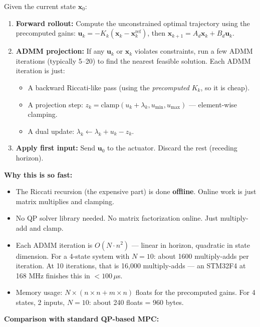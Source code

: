 Given the current state $\mathbf{x}_0$:
\begin{enumerate}
    \item \textbf{Forward rollout:} Compute the unconstrained optimal trajectory using the precomputed gains: $\mathbf{u}_k = -K_k (\mathbf{x}_k - \mathbf{x}_k^{\text{ref}})$, then $\mathbf{x}_{k+1} = A_d \mathbf{x}_k + B_d \mathbf{u}_k$.
    \item \textbf{ADMM projection:} If any $\mathbf{u}_k$ or $\mathbf{x}_k$ violates constraints, run a few ADMM iterations (typically 5--20) to find the nearest feasible solution. Each ADMM iteration is just:
    \begin{itemize}[nosep]
        \item A backward Riccati-like pass (using the \textit{precomputed} $K_k$, so it is cheap).
        \item A projection step: $z_k = \text{clamp}(u_k + \lambda_k, u_{\min}, u_{\max})$ --- element-wise clamping.
        \item A dual update: $\lambda_k \leftarrow \lambda_k + u_k - z_k$.
    \end{itemize}
    \item \textbf{Apply first input:} Send $\mathbf{u}_0$ to the actuator. Discard the rest (receding horizon).
\end{enumerate}

\textbf{Why this is so fast:}
\begin{itemize}
    \item The Riccati recursion (the expensive part) is done \textbf{offline}. Online work is just matrix multiplies and clamping.
    \item No QP solver library needed. No matrix factorization online. Just multiply-add and clamp.
    \item Each ADMM iteration is $O(N \cdot n^2)$ --- linear in horizon, quadratic in state dimension. For a 4-state system with $N = 10$: about 1600 multiply-adds per iteration. At 10 iterations, that is 16,000 multiply-adds --- an STM32F4 at 168 MHz finishes this in $< 100\,\mu$s.
    \item Memory usage: $N \times (n \times n + m \times n)$ floats for the precomputed gains. For 4 states, 2 inputs, $N = 10$: about 240 floats = 960 bytes.
\end{itemize}

\textbf{Comparison with standard QP-based MPC:}

